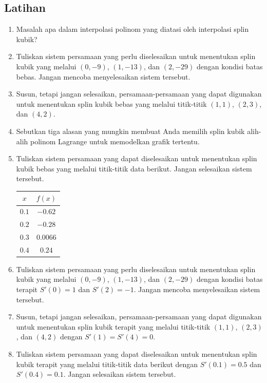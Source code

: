\subsection{Latihan}
\begin{enumerate}
\item Masalah apa dalam interpolasi polinom yang diatasi oleh interpolasi
splin kubik?
\item \label{exc:cubicSplines}Tuliskan sistem persamaan yang perlu diselesaikan
untuk menentukan splin kubik yang melalui $(0,-9)$, $(1,-13)$, dan
$(2,-29)$ dengan kondisi batas bebas. Jangan mencoba menyelesaikan
sistem tersebut. \hasasolution 
\item \label{exc:cubicSplines-1}Susun, tetapi jangan selesaikan, persamaan-persamaan
yang dapat digunakan untuk menentukan splin kubik bebas yang melalui
titik-titik $(1,1)$, $(2,3)$, dan $(4,2)$.
\item Sebutkan tiga alasan yang mungkin membuat Anda memilih splin kubik
alih-alih polinom Lagrange untuk memodelkan grafik tertentu.
\item \label{exc:cubicSplines-2}Tuliskan sistem persamaan yang dapat diselesaikan
untuk menentukan splin kubik bebas yang melalui titik-titik data berikut.
Jangan selesaikan sistem tersebut.

\begin{center}
\begin{tabular}{c|c}
$x$ & $f(x)$\tabularnewline
\hline 
$0.1$ & $-0.62$\tabularnewline
$0.2$ & $-0.28$\tabularnewline
$0.3$ & $0.0066$\tabularnewline
$0.4$ & $0.24$\tabularnewline
\end{tabular}
\par\end{center}
\item \label{exc:cubicSplines-3}Tuliskan sistem persamaan yang perlu diselesaikan
untuk menentukan splin kubik yang melalui $(0,-9)$, $(1,-13)$, dan
$(2,-29)$ dengan kondisi batas terapit $S'(0)=1$ dan $S'(2)=-1$.
Jangan mencoba menyelesaikan sistem tersebut.
\item \label{exc:cubicSplines-4}Susun, tetapi jangan selesaikan, persamaan-persamaan
yang dapat digunakan untuk menentukan splin kubik terapit yang melalui
titik-titik $(1,1)$, $(2,3)$, dan $(4,2)$ dengan $S'(1)=S'(4)=0$. \hasasolution 
\item \label{exc:cubicSplines-5}Tuliskan sistem persamaan yang dapat diselesaikan
untuk menentukan splin kubik terapit yang melalui titik-titik data
berikut dengan $S'(0.1)=0.5$ dan $S'(0.4)=0.1$. Jangan selesaikan
sistem tersebut.


\end{enumerate}
